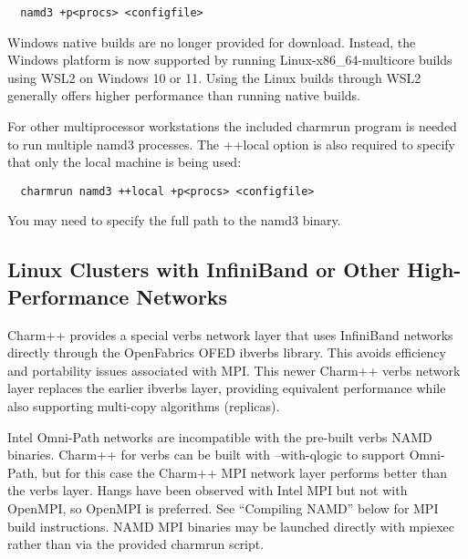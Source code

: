 \begin{verbatim}
  namd3 +p<procs> <configfile>
\end{verbatim}

Windows native builds are no longer provided for download. 
Instead, the Windows platform is now supported by running 
Linux-x86\_64-multicore builds using WSL2 on Windows 10 or 11. 
Using the Linux builds through WSL2 generally offers higher performance 
than running native builds. 

For other multiprocessor workstations the included charmrun program is
needed to run multiple namd3 processes.  The ++local option is also
required to specify that only the local machine is being used:
\begin{verbatim}
  charmrun namd3 ++local +p<procs> <configfile>
\end{verbatim}
You may need to specify the full path to the namd3 binary.

% 

\subsection{Linux Clusters with InfiniBand or Other High-Performance Networks}

Charm++ provides a special verbs network layer that uses InfiniBand
networks directly through the OpenFabrics OFED ibverbs library.  This
avoids efficiency and portability issues associated with MPI.  
This newer Charm++ verbs network layer replaces the earlier 
ibverbs layer, providing equivalent performance 
while also supporting multi-copy algorithms (replicas).
  
Intel Omni-Path networks are incompatible with the pre-built verbs
NAMD binaries.  Charm++ for verbs can be built with --with-qlogic 
to support Omni-Path, but for this case the Charm++ MPI network layer performs
better than the verbs layer.  Hangs have been observed with Intel MPI
but not with OpenMPI, so OpenMPI is preferred.  See ``Compiling NAMD''
below for MPI build instructions.  NAMD MPI binaries may be launched
directly with mpiexec rather than via the provided charmrun script.

